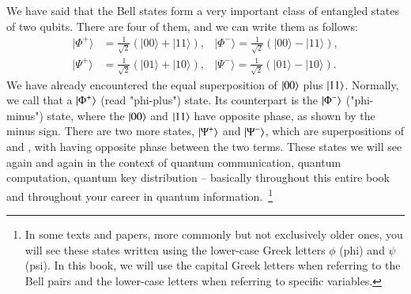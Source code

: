 We have said that the Bell states form a very important class of entangled states of two qubits. There are four of them, and we can write them as follows: 
\begin{equation}
    \begin{aligned}
        |\Phi^+\rangle & = \frac{1}{\sqrt{2}} \left( |00\rangle + |11\rangle \right), & 
        |\Phi^-\rangle = \frac{1}{\sqrt2} \left( |00\rangle - |11\rangle \right), \\
        |\Psi^+\rangle & = \frac{1}{\sqrt{2}} \left( |01\rangle + |10\rangle \right), & 
        |\Psi^-\rangle = \frac{1}{\sqrt2} \left(|01\rangle - |10\rangle \right).
    \end{aligned}
\end{equation}
We have already encountered the equal superposition of $\left| 00 \right\rangle$ plus $\left| 11 \right\rangle$. Normally, we call that a $\left| \Phi^+ \right\rangle$ (read "phi-plus") state. Its counterpart is the $\left| \Phi^- \right\rangle$ ("phi-minus") state, where the $\left| 00 \right\rangle$ and $\left| 11 \right\rangle$ have opposite phase, as shown by the minus sign. There are two more states, $\left| \Psi^+ \right\rangle$ and $\left| \Psi^- \right\rangle$, which are superpositions of  and , with \ket{\Psi^-} having opposite phase between the two terms.  These states we will see again and again in the context of quantum communication, quantum computation, quantum key distribution -- basically throughout this entire book and throughout your career in quantum information.~\footnote{In some texts and papers, more commonly but not exclusively older ones, you will see these states written using the lower-case Greek letters $\phi$ (phi) and $\psi$ (psi).  In this book, we will use the capital Greek letters when referring to the Bell pairs and the lower-case letters when referring to specific variables.} 

